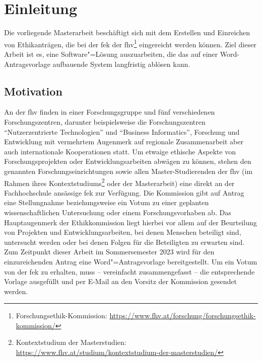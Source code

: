 \documentclass[a4paper,12pt,twoside]{scrreprt}
\begin{document}
\cleardoublepage
{}

\chapter{Einleitung}
\label{chap:einleitung}

Die vorliegende Masterarbeit beschäftigt sich mit dem Erstellen und Einreichen von Ethikanträgen, die bei der \ac{fek} der \ac{fhv}\footnote{Forschungsethik-Kommission: \url{https://www.fhv.at/forschung/forschungsethik-kommission/}} eingereicht werden können. Ziel dieser Arbeit ist es, eine Software"=Lösung auszuarbeiten, die das auf einer Word-Antragsvorlage aufbauende System langfristig ablösen kann.

\section{Motivation}
\label{sec:motivation}

An der \acl{fhv} finden in einer Forschungsgruppe und fünf verschiedenen Forschungszentren, darunter beispielsweise die Forschungszentren \enquote{Nutzerzentrierte Technologien} und \enquote{Business Informatics}, Forschung und Entwicklung mit vermehrtem Augenmerk auf regionale Zusammenarbeit aber auch internationale Kooperationen statt. \cite{fachhochschule_vorarlberg_gmbh_forschung_2021} Um etwaige ethische Aspekte von Forschungsprojekten oder Entwicklungsarbeiten abwägen zu können, stehen den genannten Forschungseinrichtungen sowie allen Master-Studierenden der \acl{fhv} (im Rahmen ihres Kontextstudiums\footnote{Kontextstudium der Masterstudien: \url{https://www.fhv.at/studium/kontextstudium-der-masterstudien/}} oder der Masterarbeit) eine direkt an der Fachhochschule ansässige \acl{fek} zur Verfügung. Die Kommission gibt auf Antrag eine Stellungnahme beziehungsweise ein Votum zu einer geplanten wissenschaftlichen Untersuchung oder einem Forschungsvorhaben ab. Das Hauptaugenmerk der Ethikkommission liegt hierbei vor allem auf der Beurteilung von Projekten und Entwicklungsarbeiten, bei denen Menschen beteiligt sind, untersucht werden oder bei denen Folgen für die Beteiligten zu erwarten sind. Zum Zeitpunkt dieser Arbeit im Sommersemester 2023 wird für den einzureichenden Antrag eine Word"=Antragsvorlage bereitgestellt. Um ein Votum von der \acl{fek} zu erhalten, muss -- vereinfacht zusammengefasst -- die entsprechende Vorlage ausgefüllt und per E-Mail an den Vorsitz der Kommission gesendet werden. \cite{fachhochschule_vorarlberg_gmbh_forschungsethik-kommission_2021}
\end{document}
